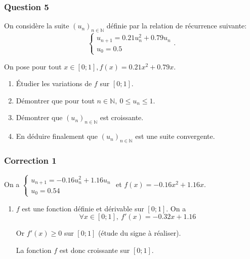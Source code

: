 \documentclass[15pt, mathserif]{beamer}
\begin{document}
\begin{frame} 
	\frametitle{Question 5}
On considère la suite $(u_n)_{n\in\mathbb{N}}$ définie par la relation de récurrence suivante:\[\begin{cases} u_{n+1} = 0.21u_n^2+0.79u_n\\[1em] u_0 = 0.5\end{cases}.\]

On pose pour tout $x \in [0;1], f(x) = 0.21x^2+0.79x$.

\begin{enumerate}
	\item Étudier les variations de $f$ sur $[0;1]$.
	\item Démontrer que pour tout $n \in \mathbb{N}, ~0 \leq u_n \leq 1$.
	\item Démontrer que $(u_n)_{n\in\mathbb{N}}$ est croissante.
	\item En déduire finalement que $(u_n)_{n\in\mathbb{N}}$ est une suite convergente.
\end{enumerate}
\end{frame}


\begin{frame}
\vspace{-10mm}
	\frametitle{Correction 1}
On a $\begin{cases} u_{n+1} = -0.16u_n^2+1.16u_n\\[1em] u_0 = 0.54\end{cases}$ et $f(x) = -0.16x^2+1.16x$.

\begin{enumerate}
	\item $f$ est une fonction définie et dérivable sur $[0;1]$. On a \[\forall x \in [0;1], ~ f'(x) = -0.32x+1.16\]

 Or $f'(x) \geq 0$ sur $[0;1]$ (étude du signe à réaliser). 

La fonction $f$ est donc croissante sur $[0;1]$.

\end{enumerate}
\end{frame}
\end{document}
